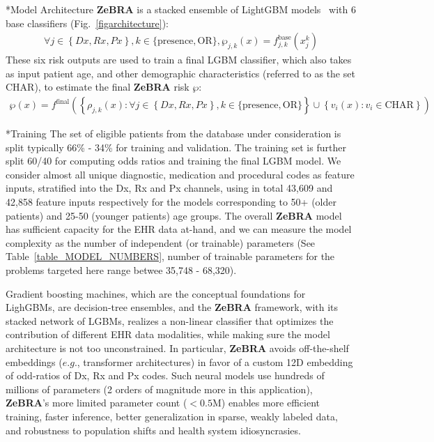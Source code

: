 \documentclass[onecolumn, compsoc,11pt]{IEEEtran}
\makeatletter
\def\zebra{\textbf{ZeBRA}\xspace}
\def\EQSP{3pt}
\newcommand{\cgather}[2][\EQSP]{\begingroup\setlength\abovedisplayskip{#1}\setlength\belowdisplayskip{#1}\begin{gather} #2 \end{gather}\endgroup\noindent}
\renewcommand\section{\@startsection {section}{1}{\z@}
  {1pt \@plus -3ex \@minus 0ex}
  {.1pt}
  {\large\bfseries\scshape\color{black!70}}}
\renewcommand\paragraph{\@startsection {section}{1}{\z@}
  {-.1ex \@plus -.5ex \@minus -.2ex}
  {0.0ex \@plus.5ex}
  {\fontsize{11}{10}\selectfont\bfseries\itshape\sffamily}}
\def\zebra{\textbf{ZeBRA}\xspace}
\def\zcor{\zebra}
\makeatother
\begin{document}
\section*{Model Architecture}
\zcor is a stacked ensemble of LightGBM models~\cite{ke2017lightgbm} with $6$ base classifiers (Fig.~\ref{figarchitecture}):
\cgather{
\forall j \in \left  \{Dx,Rx,Px \right \},   k \in \{\text{presence}, \text{OR}\}, \wp_{j,k}(x) = f^{\text{base}}_{j,k}(x_j^k)
}
These six risk outputs are used to train a final LGBM classifier, which also takes  as input patient age, and other demographic characteristics (referred to as the set $\text{CHAR}$), to estimate the final \zcor risk $\wp$:
\cgather{
\wp(x) = f^{\text{final}}\left (\left \{ \rho_{j,k}(x):\forall j \in \left  \{Dx,Rx,Px \right \},   k \in \{\text{presence}, \text{OR}\}  \right  \}\cup \left \{v_i(x): v_i \in \text{CHAR} \right \} \right )
}
\paragraph*{Training} The  set of eligible patients from the database under consideration  is split typically 66\% - 34\% for training and validation. The training set is further split 60/40 for computing odds ratios and training the final LGBM model.
We consider almost all unique  diagnostic, medication and procedural codes as feature inputs, stratified into the Dx, Rx and Px channels, using in total 43,609 and 42,858 feature inputs respectively for the models corresponding to  50+ (older patients)  and 25-50 (younger patients) age groups. The overall \zcor model has sufficient capacity for the EHR data at-hand, and we can measure the model  complexity as the number of independent (or trainable) parameters (See Table~\ref{table_MODEL_NUMBERS}, number of trainable parameters for the problems targeted here range betwee 35,748 - 68,320). 

Gradient boosting machines, which are the conceptual foundations for LighGBMs,  are decision-tree ensembles, and the \zcor framework, with its stacked network of LGBMs, realizes a non-linear classifier that optimizes the contribution of different EHR data modalities, while making sure the model architecture is not too unconstrained.  In particular, \zcor  avoids off-the-shelf embeddings ($e.g.$, transformer architectures) in favor of a custom 12D embedding of odd-ratios of Dx, Rx and Px codes. Such  neural models  use hundreds of millions of parameters (2 orders of magnitude more  in this application), \zcor’s more limited parameter count ($<0.5$M) enables  more efficient training, faster inference, better generalization in sparse, weakly labeled data, and robustness to population shifts and health system idiosyncrasies.
\end{document}
